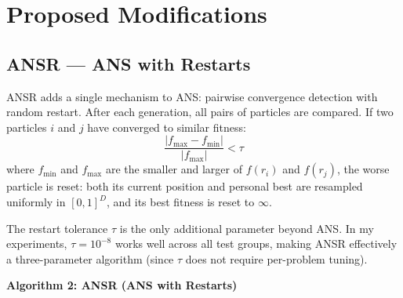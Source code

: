 \documentclass[11pt,a4paper]{article}
\begin{document}
\section{Proposed Modifications}

\subsection{ANSR --- ANS with Restarts}

ANSR adds a single mechanism to ANS: pairwise convergence detection with random restart. After each generation, all pairs of particles are compared. If two particles $i$ and $j$ have converged to similar fitness:
\begin{equation}
    \frac{|f_{\max} - f_{\min}|}{|f_{\max}|} < \tau
    \label{eq:restart_condition}
\end{equation}
where $f_{\min}$ and $f_{\max}$ are the smaller and larger of $f(r_i)$ and $f(r_j)$, the worse particle is reset: both its current position and personal best are resampled uniformly in $[0, 1]^D$, and its best fitness is reset to $\infty$.

The restart tolerance $\tau$ is the only additional parameter beyond ANS. In my experiments, $\tau = 10^{-8}$ works well across all test groups, making ANSR effectively a three-parameter algorithm (since $\tau$ does not require per-problem tuning).

\bigskip
\noindent\textbf{Algorithm 2: ANSR (ANS with Restarts)}
\label{alg:ansr}

\smallskip
\noindent{}
\end{document}
